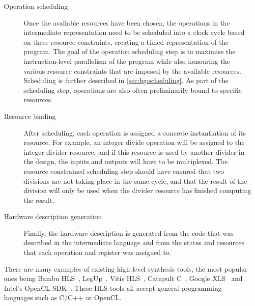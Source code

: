 \begin{description}
\item[Operation scheduling] Once the available resources have been chosen, the
  operations in the intermediate representation need to be scheduled into a
  clock cycle based on these resource constraints, creating a timed
  representation of the program.  The goal of the operation scheduling step is
  to maximise the instruction-level parallelism of the program while also
  honouring the various resource constraints that are imposed by the available
  resources.  Scheduling is further described in \cref{sec:bg:scheduling}.  As
  part of the scheduling step, operations are also often preliminarily bound to
  specific resources.

\item[Resource binding] After scheduling, each operation is assigned a concrete
  instantiation of its resource.  For example, an integer divide operation will
  be assigned to the integer divider resource, and if this resource is used by
  another divider in the design, the inputs and outputs will have to be
  multiplexed.  The resource constrained scheduling step should have ensured
  that two divisions are not taking place in the same cycle, and that the result
  of the division will only be used when the divider resource has finished
  computing the result.

\item[Hardware description generation] Finally, the hardware description is
  generated from the code that was described in the intermediate language and
  from the states and resources that each operation and register was assigned
  to.
\end{description}

There are many examples of existing high-level synthesis tools, the most popular
ones being Bambu HLS~\cite{pilato13_bambu}, LegUp~\cite{canis13_l}, Vitis
HLS~\cite{amd23_vitis_high_synth}, Catapult
C~\cite{mentor20_catap_high_level_synth}, Google XLS~\cite{google24_gx} and
Intel's OpenCL SDK~\cite{intel20_sdk_openc_applic}.  These HLS tools all accept
general programming languages such as C/C++ or OpenCL.


